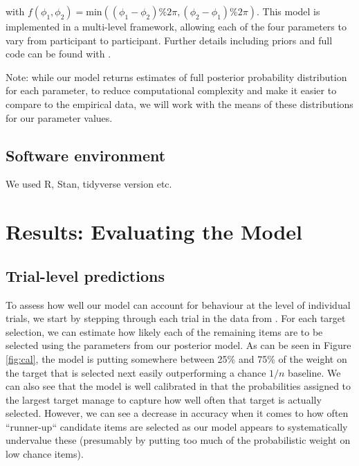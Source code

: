 \documentclass[vision,article,submit,pdftex,moreauthors]{Definitions/mdpi}
\begin{document}
with $f(\phi_1, \phi_2) = \text{min}((\phi_1 - \phi_2) \% 2\pi, (\phi_2 - \phi_1) \% 2\pi)$. This model is implemented in a multi-level framework, allowing each of the four parameters to vary from participant to participant. Further details including priors and full code can be found with \cite{clarke2022foraging}.

Note: while our model returns estimates of full posterior probability distribution for each parameter, to reduce computational complexity and make it easier to compare to the empirical data, we will work with the means of these distributions for our parameter values. 

\subsection{Software environment}
 
 We used R, Stan, tidyverse version etc. 

\section{Results: Evaluating the Model}

\subsection{Trial-level predictions}

To assess how well our model can account for behaviour at the level of individual trials, we start by stepping through each trial in the data from \cite{clarke2022}. For each target selection, we can estimate how likely each of the remaining items are to be selected using the parameters from our posterior model. As can be seen in Figure \ref{fig:cal}, the model is putting somewhere between 25\% and 75\% of the weight on the target that is selected next easily outperforming a chance $1/n$ baseline. We can also see  that the model is well calibrated in that the probabilities assigned to the largest target manage to capture how well often that target is actually selected. However, we can see a decrease in accuracy when it comes to how often ``runner-up`` candidate items are selected as our model appears to systematically undervalue these (presumably by putting too much of the probabilistic weight on low chance items).
\end{document}
